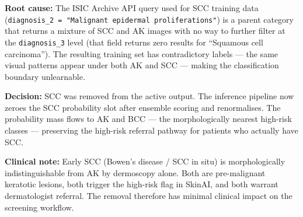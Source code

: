 \documentclass[12pt,a4paper]{article}
\begin{document}
\textbf{Root cause:} The ISIC Archive API query used for SCC training data
(\texttt{diagnosis\_2 = "Malignant epidermal proliferations"}) is a parent category
that returns a mixture of SCC and AK images with no way to further filter at the
\texttt{diagnosis\_3} level (that field returns zero results for ``Squamous cell carcinoma'').
The resulting training set has contradictory labels --- the same visual patterns
appear under both AK and SCC --- making the classification boundary unlearnable.

\textbf{Decision:} SCC was removed from the active output. The inference pipeline
now zeroes the SCC probability slot after ensemble scoring and renormalises.
The probability mass flows to AK and BCC --- the morphologically nearest high-risk
classes --- preserving the high-risk referral pathway for patients who actually have SCC.

\textbf{Clinical note:} Early SCC (Bowen's disease / SCC in situ) is morphologically
indistinguishable from AK by dermoscopy alone. Both are pre-malignant keratotic
lesions, both trigger the high-risk flag in SkinAI, and both warrant dermatologist
referral. The removal therefore has minimal clinical impact on the screening workflow.
\end{document}
